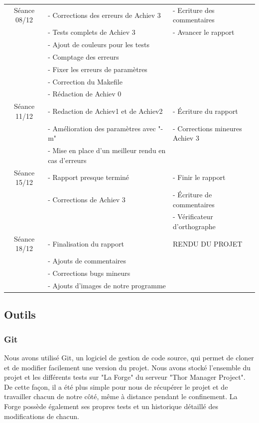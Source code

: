 \documentclass[a4paper]{article}
\begin{document}
\begin{tabular}{|c|l|l|}
     Séance 08/12
     & - Corrections des erreurs de Achiev 3 & - Ecriture des commentaires \\
     & - Tests complets de Achiev 3 & - Avancer le rapport \\
     & - Ajout de couleurs pour les tests & \\
     & - Comptage des erreurs & \\
     & - Fixer les erreurs de paramètres & \\
     & - Correction du Makefile & \\
     & - Rédaction de Achiev 0 & \tabularnewline
     \hline
     
     Séance 11/12 
     & - Redaction de Achiev1 et de Achiev2 & - Écriture du rapport \\
     & - Amélioration des paramètres avec "-m" & - Corrections mineures Achiev 3\\
     & - Mise en place d'un meilleur rendu en cas d'erreurs & \tabularnewline
     
     \hline
     Séance 15/12 
     & - Rapport presque terminé & - Finir le rapport \\
     & - Corrections de Achiev 3 & - Écriture de commentaires \\
     & & - Vérificateur d'orthographe \tabularnewline
     \hline
     
     Séance 18/12
     & - Finalisation du rapport &   RENDU DU PROJET \\
     & - Ajouts de commentaires & \\
     & - Corrections bugs mineurs & \\
     & - Ajouts d'images de notre programme & \tabularnewline
     \hline
\end{tabular}



\subsection{Outils}
\subsubsection{Git}
Nous avons utilisé Git, un logiciel de gestion de code source, qui permet de cloner et de modifier facilement une version du projet. Nous avons stocké l'ensemble du projet et les différents tests sur "La Forge" du serveur "Thor Manager Project". De cette façon, il a été plus simple pour nous de récupérer le projet et de travailler chacun de notre côté, même à distance pendant le confinement. La Forge possède également ses propres tests et un historique détaillé des modifications de chacun.
\end{document}

